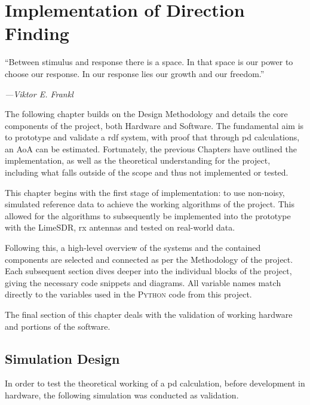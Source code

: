 \documentclass[class=report,11pt,crop=false]{standalone}
\begin{document}
\ifstandalone
\tableofcontents
\fi

\chapter{Implementation of Direction Finding\label{ch:design}}
\epigraph{``Between stimulus and response there is a space. In that space is our power to choose our response. In our response lies our growth and our freedom.''}
    {\emph{---Viktor E. Frankl}}
\vspace{0.5cm}

The following chapter builds on the Design Methodology and details the core components of the project, both Hardware and Software. The fundamental aim is to prototype and validate a \gls{rdf} system, with proof that through \gls{pd} calculations, an \gls{AoA} can be estimated. Fortunately, the previous Chapters have outlined the implementation, as well as the theoretical understanding for the project, including what falls outside of the scope and thus not implemented or tested. 

This chapter begins with the first stage of implementation: to use non-noisy, simulated reference data to achieve the working algorithms of the project. This allowed for the algorithms to subsequently be implemented into the prototype with the LimeSDR, \gls{rx} antennas and tested on real-world data. 

Following this, a high-level overview of the systems and the contained components are selected and connected as per the Methodology of the project. Each subsequent section dives deeper into the individual blocks of the project, giving the necessary code snippets and diagrams. All variable names match directly to the variables used in the \textsc{Python} code from this project. 

The final section of this chapter deals with the validation of working hardware and portions of the software. 
\section{Simulation Design}\label{sec:Design/SimulationDesign}
In order to test the theoretical working of a \gls{pd} calculation, before development in hardware, the following simulation was conducted as validation.
\end{document}
